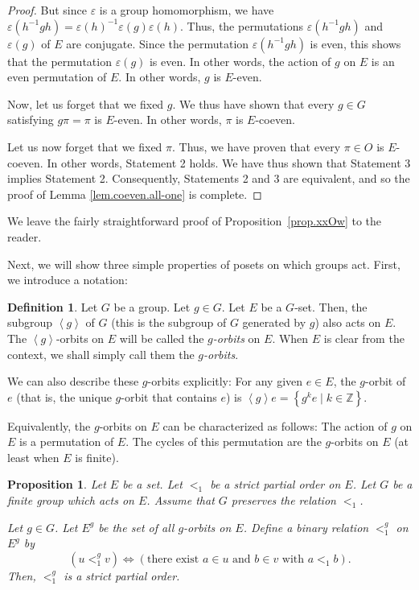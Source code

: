 \documentclass[12pt]{article}
\theoremstyle{plain}
\newtheorem{proposition}[theorem]{Proposition}
\theoremstyle{definition}
\newtheorem{definition}[theorem]{Definition}
\theoremstyle{remark}
\newcommand{\ZZ}{{\mathbb{Z}}}
\begin{document}
\begin{proof}
But since $\varepsilon$ is a group homomorphism, we have $\varepsilon\left(
h^{-1}gh\right)  =\varepsilon\left(  h\right)  ^{-1}\varepsilon\left(
g\right)  \varepsilon\left(  h\right)  $. Thus, the permutations
$\varepsilon\left(  h^{-1}gh\right)  $ and $\varepsilon\left(  g\right)  $ of
$E$ are conjugate. Since the permutation $\varepsilon\left(  h^{-1}gh\right)
$ is even, this shows that the permutation $\varepsilon\left(  g\right)  $ is
even. In other words, the action of $g$ on $E$ is an even permutation of $E$.
In other words, $g$ is $E$-even.

Now, let us forget that we fixed $g$. We thus have shown that every $g\in G$
satisfying $g\pi=\pi$ is $E$-even. In other words, $\pi$ is $E$-coeven.

Let us now forget that we fixed $\pi$. Thus, we have proven that every $\pi\in
O$ is $E$-coeven. In other words, Statement 2 holds. We have thus shown that
Statement 3 implies Statement 2. Consequently, Statements 2 and 3 are
equivalent, and so the proof of Lemma \ref{lem.coeven.all-one} is complete.
\end{proof}


We leave the fairly straightforward proof of Proposition~\ref{prop.xxOw}
to the reader.


Next, we will show three simple properties of posets on which
groups act. First, we introduce a notation:

\begin{definition}
\label{def.G-poset.g-orbit}
Let $G$ be a group. Let $g \in G$. Let $E$ be a $G$-set.
Then, the subgroup $\left< g \right>$ of $G$ (this is the
subgroup of $G$ generated by $g$) also acts on $E$. The
$\left< g \right>$-orbits on $E$ will be called the
\textit{$g$-orbits} on $E$. When $E$ is clear from the
context, we shall simply call them the
\textit{$g$-orbits}.

We can also describe these $g$-orbits explicitly: For any given
$e \in E$, the $g$-orbit of $e$ (that is, the unique
$g$-orbit that contains $e$) is
$\left< g \right> e = \left\{ g^k e \mid k \in \ZZ \right\}$.

Equivalently, the $g$-orbits on $E$ can be characterized as
follows: The action of $g$ on $E$ is a permutation of $E$.
The cycles of this permutation are the $g$-orbits on $E$
(at least when $E$ is finite).
\end{definition}

\begin{proposition}
\label{prop.G-poset.quot.poset}
Let $E$ be a set. Let $<_1$ be a strict partial order on $E$.
Let $G$ be a finite group which acts on $E$. Assume that $G$ preserves
the relation $<_1$.

Let $g \in G$. Let $E^g$ be the set of all $g$-orbits
on $E$. Define a binary relation $<_1^g$ on $E^g$ by
\[
\left(  u<_{1}^{g}v\right)  \Longleftrightarrow\left(  \text{there exist }a\in
u\text{ and }b\in v\text{ with }a<_{1}b\right)  .
\]
Then, $<_1^g$ is a strict partial order.
\end{proposition}
\end{document}
